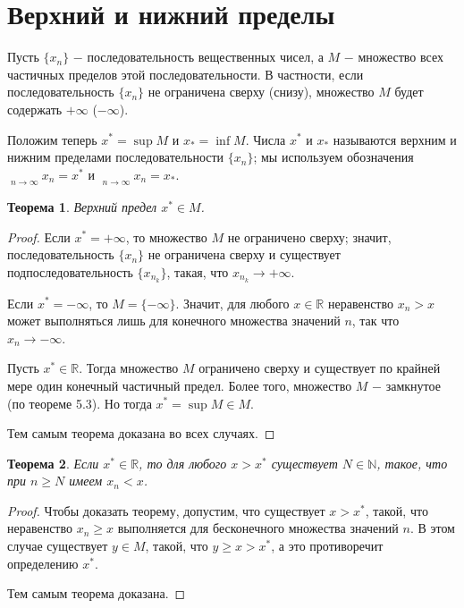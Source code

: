\documentclass{article}
\newtheorem{theorem}{Теорема}[section]
\DeclareMathOperator*\lowlim{\underline{lim}}
\DeclareMathOperator*\uplim{\overline{lim}}
\begin{document}
\section{Верхний и нижний пределы}

Пусть \(\{x_n\}\) \(-\) последовательность вещественных чисел, а \(M\) \(-\) множество всех частичных пределов этой последовательности. В частности, если последовательность \(\{x_n\}\) не ограничена сверху (снизу), множество \(M\) будет содержать \(+ \infty\) (\(- \infty\)).

Положим теперь \(x^{*} = \sup M\) и \(x_{*} = \inf M\). Числа \(x^{*}\) и \(x_{*}\) называются верхним и нижним пределами последовательности \(\{x_n\}\); мы используем обозначения \(\uplim\limits_{n \to \infty}{x_n} = x^{*}\) и \(\lowlim\limits_{n \to \infty}{x_n} = x_{*}\).

\begin{theorem}
Верхний предел \(x^{*} \in M\).
\end{theorem}

\begin{proof}
Если \(x^{*} = + \infty\), то множество \(M\) не ограничено сверху; значит, последовательность \(\{x_n\}\) не ограничена сверху и существует подпоследовательность \(\{x_{n_k}\}\), такая, что \(x_{n_k} \to + \infty\).

Если \(x^{*} = - \infty\), то \(M = \{- \infty\}\). Значит, для любого \(x \in \mathbb{R}\) неравенство \(x_n > x\) может выполняться лишь для конечного множества значений \(n\), так что \(x_n \to - \infty\).

Пусть \(x^{*} \in \mathbb{R}\). Тогда множество \(M\) ограничено сверху и существует по крайней мере один конечный частичный предел. Более того, множество \(M\) \(-\) замкнутое (по теореме 5.3). Но тогда \(x^{*} = \sup M \in M\).

Тем самым теорема доказана во всех случаях.
\end{proof}

\begin{theorem}
Если \(x^{*} \in \mathbb{R}\), то для любого \(x > x^{*}\) существует \(N \in \mathbb{N}\), такое, что при \(n \geq N\) имеем \(x_n < x\).
\end{theorem}

\begin{proof}
Чтобы доказать теорему, допустим, что существует \(x > x^{*}\), такой, что неравенство \(x_n \geq x\) выполняется для бесконечного множества значений \(n\). В этом случае существует \(y \in M\), такой, что \(y \geq x > x^{*}\), а это противоречит определению \(x^{*}\).

Тем самым теорема доказана.
\end{proof}
\end{document}
